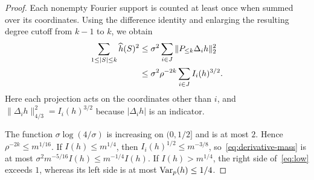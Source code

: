 \begin{proof}
Each nonempty Fourier support is counted at least once when summed
over its coordinates. Using the difference identity and enlarging
the resulting degree cutoff from $k-1$ to $k$, we obtain
\begin{align}
 \sum_{1\le|S|\le k}\widehat h(S)^2
 &\le\sigma^2\sum_{i\in J}
       \|P_{\le k}\Delta_i h\|_2^2 \notag\\
 &\le\sigma^2\rho^{-2k}\sum_{i\in J}I_i(h)^{3/2}.
 \label{eq:derivative-mass}
\end{align}
Here each projection acts on the coordinates other than $i$, and
$\|\Delta_i h\|_{4/3}^2=I_i(h)^{3/2}$ because
$|\Delta_i h|$ is an indicator.

The function $\sigma\log(4/\sigma)$ is increasing on $(0,1/2]$
and is at most $2$. Hence $\rho^{-2k}\le m^{1/16}$.
If $I(h)\le m^{1/4}$, then
$I_i(h)^{1/2}\le m^{-3/8}$, so~\eqref{eq:derivative-mass}
is at most $\sigma^2m^{-5/16}I(h)\le m^{-1/4}I(h)$.
If $I(h)>m^{1/4}$, the right side of~\eqref{eq:low} exceeds $1$,
whereas its left side is at most $\operatorname{Var}_p(h)\le1/4$.
\end{proof}
